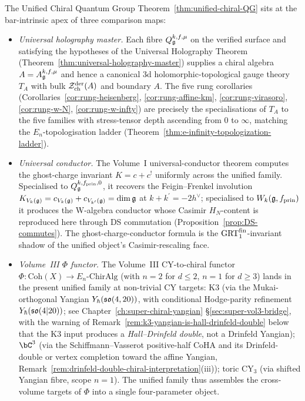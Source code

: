 \begin{remark}
\label{rem:ucqg-climax-anchors}
The Unified Chiral Quantum Group Theorem~\ref{thm:unified-chiral-QG}
sits at the bar-intrinsic apex of three comparison maps:
\begin{itemize}
\item[(a)] \emph{Universal holography master.} Each fibre
 $Q_{\mathfrak{g}}^{k,f,\mu}$ on the verified surface and satisfying the
 hypotheses of the Universal Holography Theorem
 (Theorem~\ref{thm:universal-holography-master}) supplies a chiral
 algebra $A = A_{\mathfrak{g}}^{k,f,\mu}$ and hence a canonical 3d
 holomorphic-topological gauge theory $T_A$ with bulk
 $\mathcal{Z}^{\mathrm{der}}_{\mathrm{ch}}(A)$ and boundary $A$. The five
 rung corollaries (Corollaries~\ref{cor:rung-heisenberg},
 \ref{cor:rung-affine-km}, \ref{cor:rung-virasoro},
 \ref{cor:rung-w-N}, \ref{cor:rung-w-infty}) are precisely the
 specialisations of $T_{A}$ to the five families with stress-tensor
 depth ascending from $0$ to $\infty$, matching the
 $E_n$-topologisation ladder
 (Theorem~\ref{thm:e-infinity-topologization-ladder}).
\item[(b)] \emph{Universal conductor.} The Volume~I universal-conductor
 theorem computes the ghost-charge invariant $K = c + c^{!}$
 uniformly across the unified family. Specialised to
 $Q_{\mathfrak{g}}^{k,f_{\mathrm{prin}},0}$, it recovers the Feigin--Frenkel
 involution $K_{V_k(\mathfrak{g})} = c_{V_k(\mathfrak{g})} + c_{V_{k^{\prime}}(\mathfrak{g})} =
 \dim\mathfrak{g}$ at $k+k^{\prime} = -2h^{\vee}$; specialised to
 $W_k(\mathfrak{g}, f_{\mathrm{prin}})$ it produces the W-algebra conductor
 whose Casimir $H_N$-content is reproduced here through DS commutation
 (Proposition~\ref{prop:DS-commutes}). The ghost-charge-conductor
 formula is the $\mathrm{GRT}_1^{\mathrm{fin}}$-invariant shadow of the unified
 object's Casimir-rescaling face.
\item[(c)] \emph{Volume~III $\Phi$ functor.} The Volume~III
 CY-to-chiral functor $\Phi\colon \mathrm{Coh}(X) \to
 E_n\text{-}\mathrm{ChirAlg}$ (with $n=2$ for $d \le 2$, $n=1$ for
 $d \ge 3$) lands in the present unified family at non-trivial CY
 targets: K3 (via the Mukai-orthogonal Yangian
 $Y_{\hbar}(\mathfrak{so}(4,20))$, with conditional Hodge-parity refinement
 $Y_{\hbar}(\mathfrak{so}(4|20))$; see
 Chapter~\ref{ch:super-chiral-yangian} \S\ref{sec:super-vol3-bridge},
 with the warning of Remark~\ref{rem:k3-yangian-is-hall-drinfeld-double}
 below that the K3 input produces a \emph{Hall--Drinfeld double},
 not a Drinfeld Yangian);
 $\bC^{3}$ (via the Schiffmann--Vasserot positive-half CoHA and its
 Drinfeld-double or vertex completion toward the affine Yangian,
 Remark~\ref{rem:drinfeld-double-chiral-interpretation}(iii));
 toric CY${}_{3}$ (via shifted Yangian fibre, scope $n=1$). The
 unified family thus assembles the cross-volume targets of $\Phi$
 into a single four-parameter object.
\end{itemize}
\end{remark}

